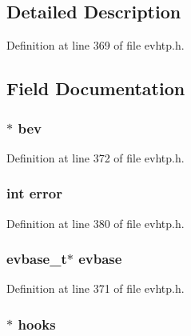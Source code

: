 \subsection{Detailed Description}


Definition at line 369 of file evhtp.h.



\subsection{Field Documentation}
\hypertarget{structevhtp__connection__s_a56cc56e5934366a7ca14026f5be0b3dd}{
\subsubsection[{bev}]{$\ast$ {\bf bev}}}
\label{structevhtp__connection__s_a56cc56e5934366a7ca14026f5be0b3dd}


Definition at line 372 of file evhtp.h.

\hypertarget{structevhtp__connection__s_a11614f44ef4d939bdd984953346a7572}{
\subsubsection[{error}]{\setlength{\rightskip}{0pt plus 5cm}int {\bf error}}}
\label{structevhtp__connection__s_a11614f44ef4d939bdd984953346a7572}


Definition at line 380 of file evhtp.h.

\hypertarget{structevhtp__connection__s_abc4ce26b166a97e5766105f253a4fe21}{
\subsubsection[{evbase}]{\setlength{\rightskip}{0pt plus 5cm}evbase\_\-t$\ast$ {\bf evbase}}}
\label{structevhtp__connection__s_abc4ce26b166a97e5766105f253a4fe21}


Definition at line 371 of file evhtp.h.

\hypertarget{structevhtp__connection__s_ac97663394f74c9030e57c771cfb7981e}{
\subsubsection[{hooks}]{$\ast$ {\bf hooks}}}
\label{structevhtp__connection__s_ac97663394f74c9030e57c771cfb7981e}



